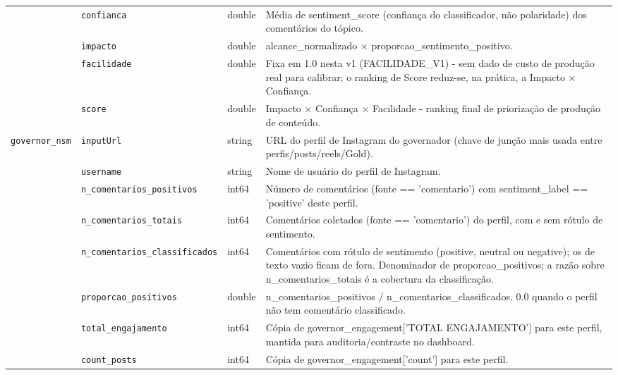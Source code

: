 \begin{footnotesize}
\begin{longtable}{p{3.2cm}p{3.0cm}p{2.0cm}p{6.0cm}}
\texttt{} & \texttt{confianca} & double & Média de sentiment\_\allowbreak{}score (confiança do classificador, não polaridade) dos comentários do tópico. \\
\texttt{} & \texttt{impacto} & double & alcance\_\allowbreak{}normalizado × proporcao\_\allowbreak{}sentimento\_\allowbreak{}positivo. \\
\texttt{} & \texttt{facilidade} & double & Fixa em 1.0 nesta v1 (FACILIDADE\_\allowbreak{}V1) - sem dado de custo de produção real para calibrar; o ranking de Score reduz-se, na prática, a Impacto × Confiança. \\
\texttt{} & \texttt{score} & double & Impacto × Confiança × Facilidade - ranking final de priorização de produção de conteúdo. \\
\texttt{governor\_\allowbreak{}nsm} & \texttt{inputUrl} & string & URL do perfil de Instagram do governador (chave de junção mais usada entre perfis/\allowbreak{}posts/\allowbreak{}reels/\allowbreak{}Gold). \\
\texttt{} & \texttt{username} & string & Nome de usuário do perfil de Instagram. \\
\texttt{} & \texttt{n\_\allowbreak{}comentarios\_\allowbreak{}positivos} & int64 & Número de comentários (fonte == 'comentario') com sentiment\_\allowbreak{}label == 'positive' deste perfil. \\
\texttt{} & \texttt{n\_\allowbreak{}comentarios\_\allowbreak{}totais} & int64 & Comentários coletados (fonte == 'comentario') do perfil, com e sem rótulo de sentimento. \\
\texttt{} & \texttt{n\_\allowbreak{}comentarios\_\allowbreak{}classificados} & int64 & Comentários com rótulo de sentimento (positive, neutral ou negative); os de texto vazio ficam de fora. Denominador de proporcao\_\allowbreak{}positivos; a razão sobre n\_\allowbreak{}comentarios\_\allowbreak{}totais é a cobertura da classificação. \\
\texttt{} & \texttt{proporcao\_\allowbreak{}positivos} & double & n\_\allowbreak{}comentarios\_\allowbreak{}positivos /\allowbreak{} n\_\allowbreak{}comentarios\_\allowbreak{}classificados. 0.0 quando o perfil não tem comentário classificado. \\
\texttt{} & \texttt{total\_\allowbreak{}engajamento} & int64 & Cópia de governor\_\allowbreak{}engagement['TOTAL ENGAJAMENTO'] para este perfil, mantida para auditoria/\allowbreak{}contraste no dashboard. \\
\texttt{} & \texttt{count\_\allowbreak{}posts} & int64 & Cópia de governor\_\allowbreak{}engagement['count'] para este perfil. \\

\end{longtable}
\end{footnotesize}
